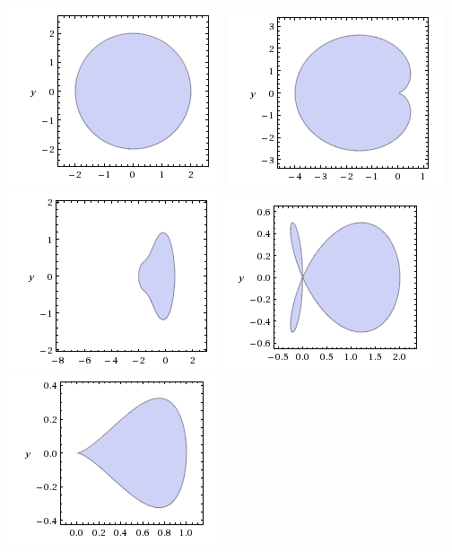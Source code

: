 \documentclass[]{article}
\begin{document}
\begin{itemize}
\begin{center}
	\includegraphics[scale = 0.75]{circle.png}
	\includegraphics[scale = 0.75]{cardioid.png} \\
	\includegraphics[scale = 0.75]{pear.png} 
	\includegraphics[scale = 0.75]{whale.png}	\\
	\includegraphics[scale = 0.75]{tear.png}

\end{center}
\end{itemize}
\end{document}
